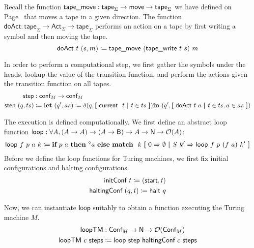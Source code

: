 Recall the function $\textsf{tape\_move}{} : \textsf{tape}_\Sigma \rightarrow \textsf{move} \rightarrow \textsf{tape}_\Sigma$ we have defined on Page~\pageref{fig:movetape} that moves a tape in a given direction. 
The function $\textsf{doAct} : \textsf{tape}_\Sigma \rightarrow \textsf{Act}_\Sigma \rightarrow \textsf{tape}_\Sigma$ performs an action on a tape by first writing a symbol and then moving the tape.
\[\textsf{doAct}~t~(s, m) \coloneqq \textsf{tape\_move}~(\textsf{tape\_write}~t~s)~m \]

In order to perform a computational step, we first gather the symbols under the heads, lookup the value of the transition function, and perform the actions given the transition function on all tapes. 
\begin{align*}
  \textsf{step} &: \textsf{conf}_M \rightarrow \textsf{conf}_M \\
  \textsf{step}~(q, ts) &\coloneqq \textbf{let}~ (q', as) \coloneqq \delta (q, \textbf{[}~ \textsf{current}~~t ~\textbf{|}~ t \in ts ~\textbf{]}) \textbf{in}~ (q', \textbf{[}~ \textsf{doAct}~t~a ~\textbf{|}~ t \in ts, a \in as ~\textbf{]}) 
\end{align*}

The execution is defined computationally. We first define an abstract loop function $\textsf{loop} : \forall A, (A \rightarrow A) \rightarrow (A \rightarrow \textsf{B}) \rightarrow A \rightarrow \mathsf{N} \rightarrow \mathcal{O}{(A)}$: 
\begin{align*}
  \textsf{loop}~f~p~a~k \coloneqq \textbf{if}~{p~a}~\textbf{then}~{\prescript{\circ}{}a}~\textbf{else}~{\textbf{match}~~k~\textbf{[}~ 0 \Rightarrow \emptyset ~\textbf{|}~ S~k' \Rightarrow \textsf{loop}~f~p~(f~a)~k' ~\textbf{]}}
\end{align*}
Before we define the loop functions for Turing machines, we first fix initial configurations and halting configurations.
\begin{align*}
  \textsf{initConf}~t \coloneqq (\textsf{start}, t) \\
  \textsf{haltingConf}~(q, t) \coloneqq \textsf{halt}~q 
\end{align*}

Now, we can instantiate $\textsf{loop}$ suitably to obtain a function executing the Turing machine $M$.
\begin{align*}
  \textsf{loopTM} &: \textsf{Conf}_M \rightarrow \mathsf{N} \rightarrow \mathcal{O}{(\textsf{Conf}_M)} \\
  \textsf{loopTM}~c~\textsf{steps} &\coloneqq \textsf{loop}~\textsf{step}~\textsf{haltingConf}~c~\textsf{steps}
\end{align*}

